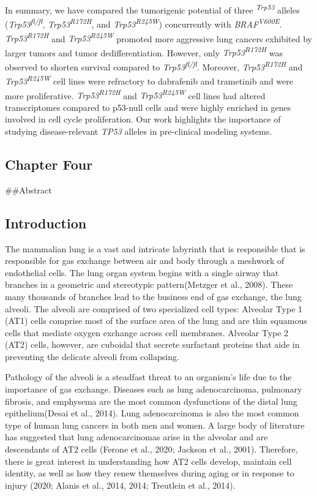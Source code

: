 In summary, we have compared the tumorigenic potential of three \emph{\textsuperscript{Trp53}} alleles (\emph{Trp53\textsuperscript{fl/fl}}, \emph{Trp53\textsuperscript{R172H}}, and \emph{Trp53\textsuperscript{R245W}}) concurrently with \emph{BRAF\textsuperscript{V600E}}. \emph{Trp53\textsuperscript{R172H}} and \emph{Trp53\textsuperscript{R245W}} promoted more aggressive lung cancers exhibited by larger tumors and tumor dedifferentiation. However, only \emph{Trp53\textsuperscript{R172H}} was observed to shorten survival compared to \emph{Trp53\textsuperscript{fl/fl}}. Moreover, \emph{Trp53\textsuperscript{R172H}} and \emph{Trp53\textsuperscript{R245W}} cell lines were refractory to dabrafenib and trametinib and were more proliferative. \emph{Trp53\textsuperscript{R172H}} and \emph{Trp53\textsuperscript{R245W}} cell lines had altered transcriptomes compared to p53-null cells and were highly enriched in genes involved in cell cycle proliferation. Our work highlights the importance of studying disease-relevant \emph{TP53} alleles in pre-clinical modeling systems.

\hypertarget{chapter-four}{%
\subsection{Chapter Four}\label{chapter-four}}

\#\#Abstract

\hypertarget{introduction-2}{%
\subsection{Introduction}\label{introduction-2}}

The mammalian lung is a vast and intricate labyrinth that is responsible that is responsible for gas exchange between air and body through a meshwork of endothelial cells. The lung organ system begins with a single airway that branches in a geometric and stereotypic pattern(Metzger et al., 2008). These many thousands of branches lead to the business end of gas exchange, the lung alveoli. The alveoli are comprised of two specialized cell types: Alveolar Type 1 (AT1) cells comprise most of the surface area of the lung and are thin squamous cells that mediate oxygen exchange across cell membranes. Alveolar Type 2 (AT2) cells, however, are cuboidal that secrete surfactant proteins that aide in preventing the delicate alveoli from collapsing.

Pathology of the alveoli is a steadfast threat to an organism's life due to the importance of gas exchange. Diseases such as lung adenocarcinoma, pulmonary fibrosis, and emphysema are the most common dysfunctions of the distal lung epithelium(Desai et al., 2014). Lung adenocarcinoma is also the most common type of human lung cancers in both men and women. A large body of literature has suggested that lung adenocarcinomas arise in the alveolar and are descendants of AT2 cells (Ferone et al., 2020; Jackson et al., 2001). Therefore, there is great interest in understanding how AT2 cells develop, maintain cell identity, as well as how they renew themselves during aging or in response to injury (2020; Alanis et al., 2014, 2014; Treutlein et al., 2014).

